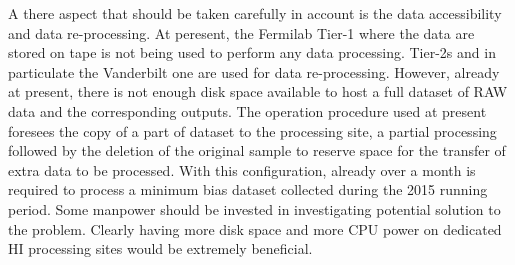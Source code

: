 A there aspect that should be taken carefully in account is the data accessibility and data re-processing. At peresent, the Fermilab Tier-1 where the data are stored on tape is not being used to perform any data processing. Tier-2s and in particulate the Vanderbilt one are used for data re-processing. However, already at present, there is not enough disk space available to host a full dataset of RAW data and the corresponding outputs. The operation procedure used at present foresees the copy of a part of dataset to the processing site, a partial processing followed by the deletion of the original sample to reserve space for the transfer of extra data to be processed. With this configuration, already over a month is required to process a minimum bias dataset collected during the 2015 running period. Some manpower should be invested in investigating potential solution to the problem. Clearly having more disk space and more CPU power on dedicated HI processing sites would be extremely beneficial. 







